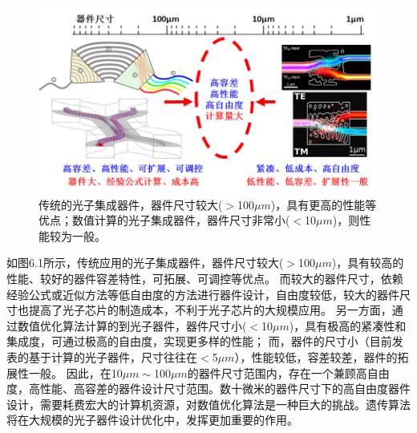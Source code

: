 \begin{figure}[!htbp]
    \centering
    \includegraphics[width=1\textwidth]{Img/6-2.png}
    \caption{传统的光子集成器件，器件尺寸较大($>$100$\mu m$)，具有更高的性能等优点；数值计算的光子集成器件，器件尺寸非常小($<$10$\mu m$)，则性能较为一般。}
    \label{fig:6-2}
\end{figure}

如图6.1所示，传统应用的光子集成器件，器件尺寸较大($>$100$\mu m$)，具有较高的性能、较好的器件容差特性，可拓展、可调控等优点。
而较大的器件尺寸，依赖经验公式或近似方法等低自由度的方法进行器件设计，自由度较低，较大的器件尺寸也提高了光子芯片的制造成本，不利于光子芯片的大规模应用。
另一方面，通过数值优化算法计算的到光子器件，器件尺寸小($<$10$\mu m$)，具有极高的紧凑性和集成度，可通过极高的自由度，实现更多样的性能；
而，器件的尺寸小（目前发表的基于计算的光子器件，尺寸往往在$<$5$\mu m$），性能较低，容差较差，器件的拓展性一般。
因此，在10$\mu m\sim$100$\mu m$的器件尺寸范围内，存在一个兼顾高自由度，高性能、高容差的器件设计尺寸范围。数十微米的器件尺寸下的高自由度器件设计，需要耗费宏大的计算机资源，对数值优化算法是一种巨大的挑战。遗传算法将在大规模的光子器件设计优化中，发挥更加重要的作用。